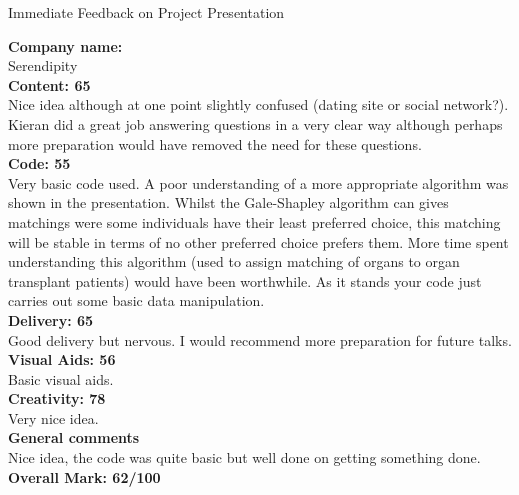 \documentclass{article}
\begin{document}
\begin{center}
\Huge{Immediate Feedback on Project Presentation}\\
\end{center}


\normalsize
\textbf{Company name:}\\

Serendipity\\

\textbf{Content: 65}\\

Nice idea although at one point slightly confused (dating site or social network?).
Kieran did a great job answering questions in a very clear way although perhaps more preparation would have removed the need for these questions.\\

\textbf{Code: 55}\\

Very basic code used.
A poor understanding of a more appropriate algorithm was shown in the presentation.
Whilst the Gale-Shapley algorithm can gives matchings were some individuals have their least preferred choice, this matching will be stable in terms of no other preferred choice prefers them.
More time spent understanding this algorithm (used to assign matching of organs to organ transplant patients) would have been worthwhile.
As it stands your code just carries out some basic data manipulation.  \\

\textbf{Delivery: 65}\\

Good delivery but nervous.
I would recommend more preparation for future talks.\\

\textbf{Visual Aids: 56}\\

Basic visual aids.\\

\textbf{Creativity: 78}\\

Very nice idea.\\

\textbf{General comments}\\

Nice idea, the code was quite basic but well done on getting something done.\\

\textbf{Overall Mark: 62/100}
\end{document}
